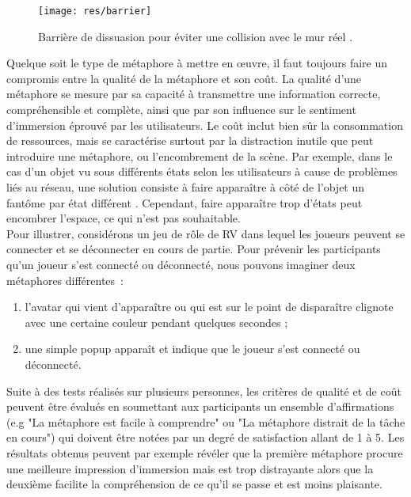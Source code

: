 \documentclass[11pt]{article}
\begin{document}
\begin{figure}
\centering
\texttt{[image: res/barrier]}
\caption{\label{fig:barrier}Barrière de dissuasion pour éviter une collision avec le mur réel \cite{survey}.}
\end{figure}

Quelque soit le type de métaphore à mettre en œuvre, il faut toujours faire un compromis entre la qualité de la métaphore et son coût. La qualité d'une métaphore se mesure par sa capacité à transmettre une information correcte, compréhensible et complète, ainsi que par son influence sur le sentiment d'immersion éprouvé par les utilisateurs. Le coût inclut bien sûr la consommation de ressources, mais se caractérise surtout par la distraction inutile que peut introduire une métaphore, ou l'encombrement de la scène. Par exemple, dans le cas d'un objet vu sous différents états selon les utilisateurs à cause de problèmes liés au réseau, une solution consiste à faire apparaître à côté de l'objet un fantôme par état différent \cite{network-errors}. Cependant, faire apparaître trop d'états peut encombrer l'espace, ce qui n'est pas souhaitable.
\\

Pour illustrer, considérons un jeu de rôle de RV dans lequel les joueurs peuvent se connecter et se déconnecter en cours de partie. Pour prévenir les participants qu'un joueur s'est connecté ou déconnecté, nous pouvons imaginer deux métaphores différentes~:
\begin{enumerate}
	\item l'avatar qui vient d'apparaître ou qui est sur le point de disparaître clignote avec une certaine couleur pendant quelques secondes ;
	\item une simple popup apparaît et indique que le joueur s'est connecté ou déconnecté.
\end{enumerate}

Suite à des tests réalisés sur plusieurs personnes, les critères de qualité et de coût peuvent être évalués en soumettant aux participants un ensemble d'affirmations (e.g "La métaphore est facile à comprendre" ou "La métaphore distrait de la tâche en cours") qui doivent être notées par un degré de satisfaction allant de 1 à 5. Les résultats obtenus peuvent par exemple révéler que la première métaphore procure une meilleure impression d'immersion mais est trop distrayante alors que la deuxième facilite la compréhension de ce qu'il se passe et est moins plaisante.
\\
\end{document}
